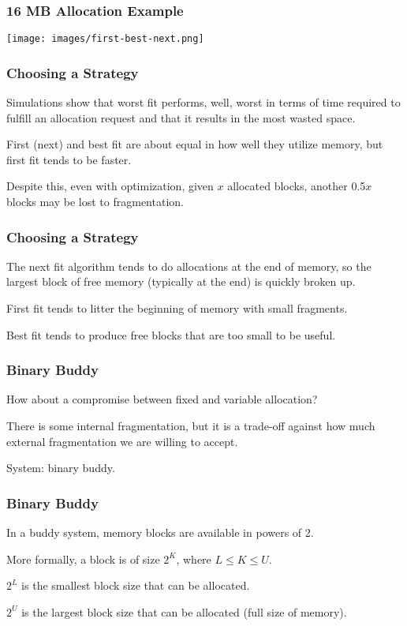 \begin{frame}
\frametitle{16 MB Allocation Example}

\begin{center}
\texttt{[image: images/first-best-next.png]}
\end{center}


\end{frame}

\begin{frame}
\frametitle{Choosing a Strategy}

Simulations show that worst fit performs, well, worst in terms of time required to fulfill an allocation request and that it results in the most wasted space. 

First (next) and best fit are about equal in how well they utilize memory, but first fit tends to be faster. 

Despite this, even with optimization, given $x$ allocated blocks, another 0.5$x$ blocks may be lost to fragmentation.

\end{frame}



\begin{frame}
\frametitle{Choosing a Strategy}

The next fit algorithm tends to do allocations at the end of memory, so the largest block of free memory (typically at the end) is quickly broken up. 

First fit tends to litter the beginning of memory with small fragments.

Best fit tends to produce free blocks that are too small to be useful. 


\end{frame}



\begin{frame}
\frametitle{Binary Buddy}
How about a compromise between fixed and variable allocation?

There is some internal fragmentation, but it is a trade-off against how much external fragmentation we are willing to accept.

System: \alert{binary buddy}.


\end{frame}



\begin{frame}
\frametitle{Binary Buddy}

In a buddy system, memory blocks are available in powers of 2. 

More formally, a block is of size $2^{K}$, where $L \leq K \leq U$.

$2^{L}$ is the smallest block size that can be allocated.

$2^{U}$ is the largest block size that can be allocated (full size of memory). 

\end{frame}



